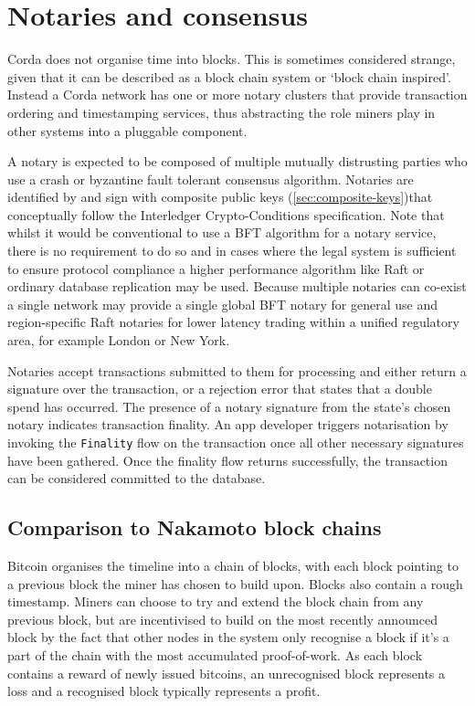 \documentclass{article}
\begin{document}
\section{Notaries and consensus}\label{sec:notaries}

Corda does not organise time into blocks. This is sometimes considered strange, given that it can be described as a
block chain system or `block chain inspired'. Instead a Corda network has one or more notary clusters that provide
transaction ordering and timestamping services, thus abstracting the role miners play in other systems into a
pluggable component.

A notary is expected to be composed of multiple mutually distrusting parties who use a crash or byzantine fault
tolerant consensus algorithm. Notaries are identified by and sign with composite public keys
(\cref{sec:composite-keys})that conceptually follow the Interledger Crypto-Conditions specification\cite{ILPCC}.
Note that whilst it would be conventional to use a BFT algorithm for a notary service, there is no requirement to
do so and in cases where the legal system is sufficient to ensure protocol compliance a higher performance
algorithm like Raft\cite{Ongaro:2014:SUC:2643634.2643666} or ordinary database replication may be used. Because
multiple notaries can co-exist a single network may provide a single global BFT notary for general use and
region-specific Raft notaries for lower latency trading within a unified regulatory area, for example London or New
York.

Notaries accept transactions submitted to them for processing and either return a signature over the transaction,
or a rejection error that states that a double spend has occurred. The presence of a notary signature from the
state's chosen notary indicates transaction finality. An app developer triggers notarisation by invoking the
\texttt{Finality} flow on the transaction once all other necessary signatures have been gathered. Once the finality
flow returns successfully, the transaction can be considered committed to the database.

\subsection{Comparison to Nakamoto block chains}

Bitcoin organises the timeline into a chain of blocks, with each block pointing to a previous block the miner has
chosen to build upon. Blocks also contain a rough timestamp. Miners can choose to try and extend the block chain
from any previous block, but are incentivised to build on the most recently announced block by the fact that other
nodes in the system only recognise a block if it's a part of the chain with the most accumulated proof-of-work. As
each block contains a reward of newly issued bitcoins, an unrecognised block represents a loss and a recognised
block typically represents a profit.
\end{document}
